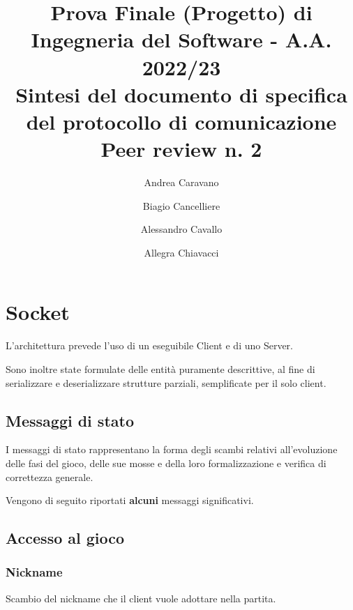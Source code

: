 \documentclass[a4paper,11pt]{article} %
\begin{document}
    \pagestyle{fancy}
    \fancyhead{}\fancyfoot{}
    \fancyfoot[C]{\thepage}

    \author{Andrea Caravano \and Biagio Cancelliere \and Alessandro Cavallo \and Allegra Chiavacci}
    \title{\textbf{\Large{Prova Finale (Progetto) di Ingegneria del Software - A.A. 2022/23\\Sintesi del documento di specifica del protocollo di comunicazione\\Peer review n. 2}}}
    \maketitle

    \tableofcontents

    \newpage


    \section{Socket}\label{sec:socket}
    L'architettura prevede l'uso di un eseguibile Client e di uno Server.

    \smallskip
    Sono inoltre state formulate delle entità puramente descrittive, al fine di serializzare e deserializzare strutture parziali, semplificate per il solo client.

    \subsection*{Messaggi di stato}

    I messaggi di stato rappresentano la forma degli scambi relativi all'evoluzione delle fasi del gioco,
    delle sue mosse e della loro formalizzazione e verifica di correttezza generale.

    \smallskip
    Vengono di seguito riportati \textbf{alcuni} messaggi significativi.

    \subsection{Accesso al gioco}\label{subsec:accesso-al-gioco}

    \subsubsection{Nickname}
    Scambio del nickname che il client vuole adottare nella partita.
\end{document}
